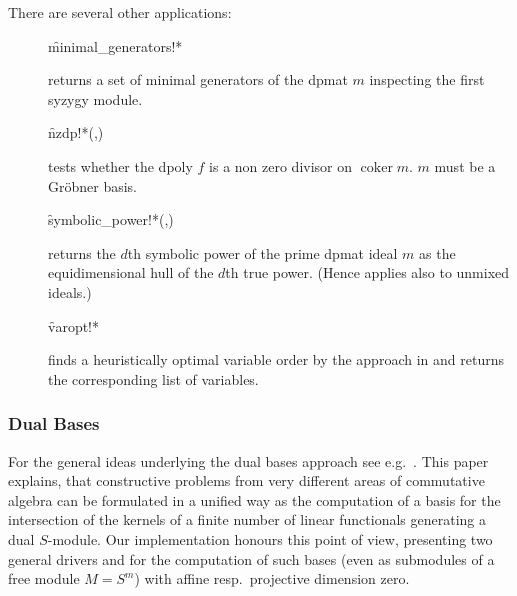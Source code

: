 There are several other applications:
\begin{description}

\item[]
  \begin{syntax}
    \f{minimal\_generators!*} 
  \end{syntax}
  \hypertarget{procedure:MINIMAL_GENERATORS!*}{}
returns a set of minimal generators of the dpmat $m$ inspecting
the first syzygy module.

\item[]
  \begin{syntax}
    \f{nzdp!*}(,)
  \end{syntax}
  \hypertarget{procedure:NZDP!*}{}
tests whether the dpoly $f$ is a non zero divisor on $\mathop{\mathrm{coker}}
m$. $m$ must be a Gr\"obner basis.

\item[]
  \begin{syntax}
    \f{symbolic\_power!*}(,)
  \end{syntax}
  \hypertarget{procedure:SYMBOLIC_POWER!*}{}
returns the $d$\/th symbolic power of the prime dpmat ideal $m$ as
the equidimensional hull of the $d$\/th true power. (Hence applies also
to unmixed ideals.)

\item[]
  \begin{syntax}
    \f{varopt!*} 
  \end{syntax}
  \hypertarget{procedure:VAROPT!*}{}
finds a heuristically optimal variable order by the approach in
\cite{Boege:86} and returns the corresponding list of variables.
\end{description}


\subsubsection{Dual Bases}


For the general ideas underlying the dual bases approach see e.g.\
\cite{Marinari:91}. This paper explains, that constructive problems from very
different areas of commutative algebra can be formulated in a unified
way as the computation of a basis for the intersection of the kernels
of a finite number of linear functionals generating a dual
$S$-module. Our implementation honours
this point of view, presenting two general drivers  and
\ind{dualhbases} for the computation of such bases (even as submodules
of a free module $M=S^m$) with affine resp.\ projective dimension zero.

